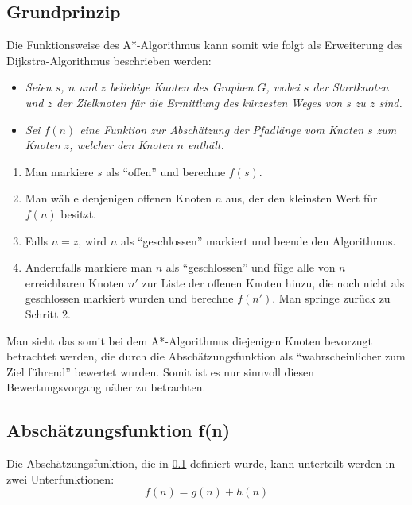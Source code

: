 	\subsection{Grundprinzip}
		\label{A*-Alg}
		Die Funktionsweise des A*-Algorithmus kann somit wie folgt als Erweiterung des Dijkstra-Algorithmus beschrieben werden\cite{Hart1968}:
		\begin{center}
			\begin{minipage}{0.8\linewidth}
				\begin{itemize}
					\item \textit{Seien $s$, $n$ und $z$ beliebige Knoten des Graphen $G$, wobei $s$ der Startknoten und $z$ der Zielknoten für die Ermittlung des kürzesten Weges von $s$ zu $z$ sind.}\\
					\item \textit{Sei $f(n)$ eine Funktion zur Abschätzung der Pfadlänge vom Knoten $s$ zum Knoten $z$, welcher den Knoten $n$ enthält.}
				\end{itemize}
		
				\begin{enumerate}
					\item Man markiere $s$ als "`offen"' und berechne $f(s)$.
					\item Man wähle denjenigen offenen Knoten $n$ aus, der den  kleinsten Wert für $f(n)$ besitzt.
					\item Falls $n=z$, wird $n$ als "`geschlossen"' markiert und beende den Algorithmus.
					\item Andernfalls markiere man $n$ als "`geschlossen"' und füge alle von $n$ erreichbaren Knoten $n'$ zur Liste der offenen Knoten hinzu, die noch nicht als geschlossen markiert wurden und berechne $f(n')$. 	Man springe zurück zu Schritt 2.
				\end{enumerate}
			\end{minipage}
		\end{center}
		
		Man sieht das somit bei dem A*-Algorithmus diejenigen Knoten bevorzugt betrachtet werden, die durch die Abschätzungsfunktion als "`wahrscheinlicher zum Ziel führend"' bewertet wurden. Somit ist es nur sinnvoll diesen Bewertungsvorgang näher zu betrachten. 
		
	
	
	
	\subsection{Abschätzungsfunktion f(n)}
		\label{Abschaetz}
		Die Abschätzungsfunktion, die in \ref{A*-Alg} definiert wurde, kann unterteilt werden in zwei Unterfunktionen\cite{Hart1968}:
		\begin{equation}
			f(n)=g(n)+h(n)
		\end{equation}
		
